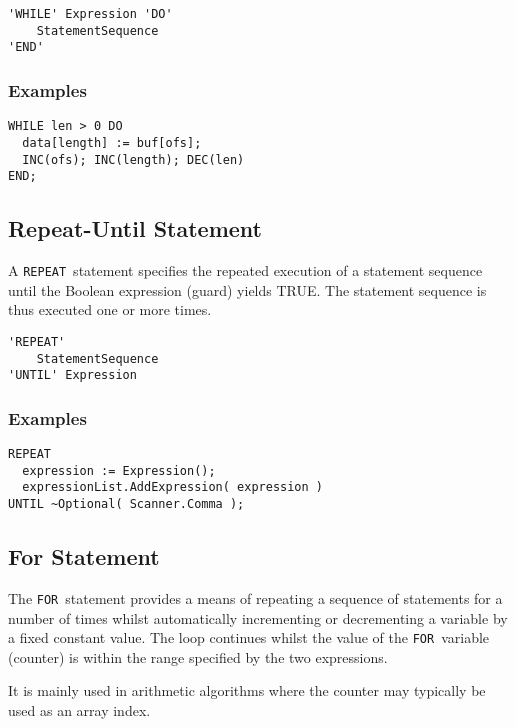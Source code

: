 \documentclass[a4wide,11pt]{article}
\newcommand{\FOR}{\lstinline"FOR"}
\newcommand{\REPEAT}{\lstinline"REPEAT"}
\begin{document}
\begin{lstlisting}[style=ebnf]
'WHILE' Expression 'DO'
    StatementSequence
'END'
\end{lstlisting}

\begin{annotation}
\subsubsection{Examples}
\begin{lstlisting}[style=example]
WHILE len > 0 DO
  data[length] := buf[ofs];
  INC(ofs); INC(length); DEC(len)
END;
\end{lstlisting}
\end{annotation}

\subsection{Repeat-Until Statement}
A \REPEAT\ statement specifies the repeated execution of a statement sequence until the Boolean expression (guard) yields TRUE.
The statement sequence is thus executed one or more times.

\begin{lstlisting}[style=ebnf]
'REPEAT'
    StatementSequence
'UNTIL' Expression
\end{lstlisting}

\begin{annotation}
\subsubsection{Examples}
\begin{lstlisting}[style=example]
REPEAT
  expression := Expression();
  expressionList.AddExpression( expression )
UNTIL ~Optional( Scanner.Comma );
\end{lstlisting}
\end{annotation}
\subsection{For Statement}
The \FOR\ statement provides a means of repeating a sequence of statements for a number of times whilst automatically incrementing or decrementing a variable by a fixed constant value.
The loop continues whilst the value of the \FOR\ variable (counter) is within the range specified by the two expressions.

It is mainly used in arithmetic algorithms where the counter may typically be used as an array index.
\end{document}
